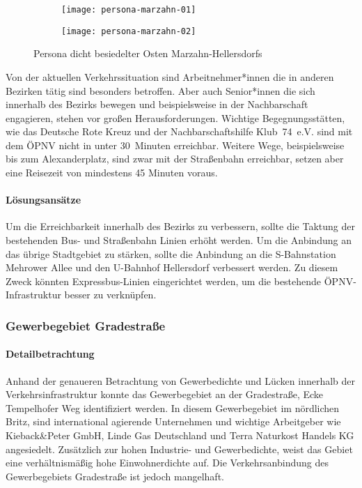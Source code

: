 \begin{figure}
    \centering
    \begin{subfigure}{.5\textwidth}
        \centering
        \texttt{[image: persona-marzahn-01]}
    \end{subfigure}%
    \begin{subfigure}{.5\textwidth}
        \centering
        \texttt{[image: persona-marzahn-02]}
    \end{subfigure}
    \caption{Persona dicht besiedelter Osten Marzahn-Hellersdorfs}
    \label{persona-marzahn-hellersdorf}
\end{figure}

Von der aktuellen Verkehrssituation sind Arbeitnehmer*innen die in anderen Bezirken tätig sind besonders betroffen. Aber auch Senior*innen die sich innerhalb des Bezirks bewegen und beispielsweise in der Nachbarschaft engagieren, stehen vor großen Herausforderungen. Wichtige Begegnungsstätten, wie das Deutsche Rote Kreuz und der Nachbarschaftshilfe Klub~74~e.V. sind mit dem ÖPNV nicht in unter 30~Minuten erreichbar. Weitere Wege, beispielsweise bis zum Alexanderplatz, sind zwar mit der Straßenbahn erreichbar, setzen aber eine Reisezeit von mindestens 45 Minuten voraus.

\paragraph{Lösungsansätze}

Um die Erreichbarkeit innerhalb des Bezirks zu verbessern, sollte die Taktung der bestehenden Bus- und Straßenbahn Linien erhöht werden. Um die Anbindung an das übrige Stadtgebiet zu stärken, sollte die Anbindung an die S-Bahnstation Mehrower Allee und den U-Bahnhof Hellersdorf verbessert werden. Zu diesem Zweck könnten Expressbus-Linien eingerichtet werden, um die bestehende ÖPNV-Infrastruktur besser zu verknüpfen.

\subsubsection{Gewerbegebiet Gradestraße}

\paragraph{Detailbetrachtung}

Anhand der genaueren Betrachtung von Gewerbedichte und Lücken innerhalb der Verkehrsinfrastruktur konnte das Gewerbegebiet an der Gradestraße, Ecke Tempelhofer Weg identifiziert werden. In diesem Gewerbegebiet im nördlichen Britz, sind international agierende Unternehmen und wichtige Arbeitgeber wie Kieback\&Peter GmbH, Linde Gas Deutschland und Terra Naturkost Handels KG angesiedelt. Zusätzlich zur hohen Industrie- und Gewerbedichte, weist das Gebiet eine verhältnismäßig hohe Einwohnerdichte auf. Die Verkehrsanbindung des Gewerbegebiets Gradestraße ist jedoch mangelhaft.

